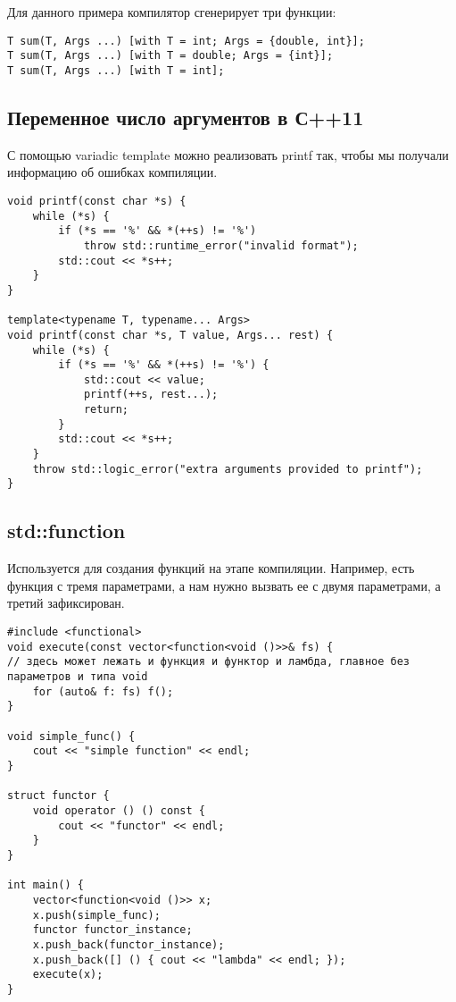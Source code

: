 Для данного примера компилятор сгенерирует  три функции:
\begin{verbatim}
T sum(T, Args ...) [with T = int; Args = {double, int}];
T sum(T, Args ...) [with T = double; Args = {int}];
T sum(T, Args ...) [with T = int];
\end{verbatim}

\subsection{Переменное число аргументов в С++11}
С помощью variadic template можно реализовать printf так, чтобы мы получали информацию об ошибках компиляции.
\begin{verbatim}
void printf(const char *s) {
	while (*s) {
		if (*s == '%' && *(++s) != '%')
			throw std::runtime_error("invalid format");
		std::cout << *s++;
	}
}

template<typename T, typename... Args>
void printf(const char *s, T value, Args... rest) {
	while (*s) {
		if (*s == '%' && *(++s) != '%') {
			std::cout << value;
			printf(++s, rest...);
			return;
		}
		std::cout << *s++;
	}
	throw std::logic_error("extra arguments provided to printf");
}
\end{verbatim}

\subsection{std::function}
Используется для создания функций на этапе компиляции.  Например, есть функция с тремя параметрами, а нам нужно вызвать ее с двумя параметрами, а третий зафиксирован. 
\begin{verbatim}
#include <functional>
void execute(const vector<function<void ()>>& fs) { 
// здесь может лежать и функция и функтор и ламбда, главное без параметров и типа void
	for (auto& f: fs) f();
}

void simple_func() {
	cout << "simple function" << endl;
}

struct functor {
	void operator () () const {
		cout << "functor" << endl;
	}
}

int main() {
	vector<function<void ()>> x;
	x.push(simple_func);
	functor functor_instance;
	x.push_back(functor_instance);
	x.push_back([] () { cout << "lambda" << endl; });
	execute(x);
}
\end{verbatim}


